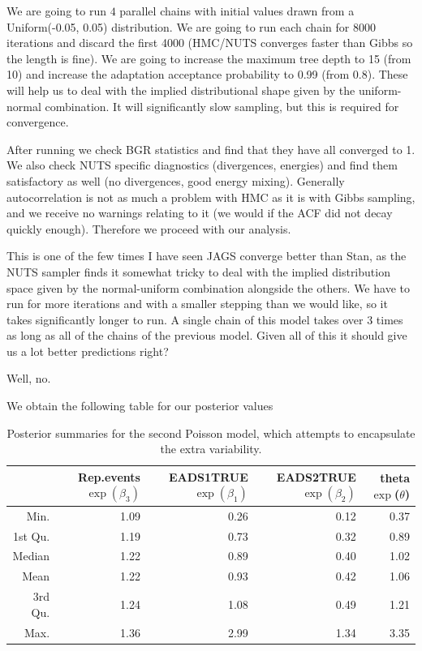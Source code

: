 \documentclass[10pt]{extarticle}
\begin{document}
We are going to run $4$ parallel chains with initial values drawn from a Uniform(-0.05, 0.05) distribution. We are going to run each chain for 8000 iterations and discard the first 4000 (HMC/NUTS converges faster than Gibbs so the length is fine). We are going to increase the maximum tree depth to 15 (from 10) and increase the adaptation acceptance probability to 0.99 (from 0.8). These will help us to deal with the implied distributional shape given by the uniform-normal combination. It will significantly slow sampling, but this is required for convergence.

After running we check BGR statistics and find that they have all converged to 1. We also check NUTS specific diagnostics (divergences, energies) and find them satisfactory as well (no divergences, good energy mixing). Generally autocorrelation is not as much a problem with HMC as it is with Gibbs sampling, and we receive no warnings relating to it (we would if the ACF did not decay quickly enough). Therefore we proceed with our analysis.

This is one of the few times I have seen JAGS converge better than Stan, as the NUTS sampler finds it somewhat tricky to deal with the implied distribution space given by the normal-uniform combination alongside the others. We have to run for more iterations and with a smaller stepping than we would like, so it takes significantly longer to run. A single chain of this model takes over 3 times as long as all of the chains of the previous model. Given all of this it should give us a lot better predictions right?

Well, no.

We obtain the following table for our posterior values

\begin{table}[ht]
	\centering
	\begin{tabular}{r|rrrr}
		\hline
		& Rep.events $\exp(\beta_3)$ & EADS1TRUE $\exp(\beta_1)$ & EADS2TRUE $\exp(\beta_2)$ & theta $\exp$($\theta$) \\ 
		\hline
		Min. & 1.09 & 0.26 & 0.12 & 0.37 \\ 
		1st Qu. & 1.19 & 0.73 & 0.32 & 0.89 \\ 
		Median & 1.22 & 0.89 & 0.40 & 1.02 \\ 
		Mean & 1.22 & 0.93 & 0.42 & 1.06 \\ 
		3rd Qu. & 1.24 & 1.08 & 0.49 & 1.21 \\ 
		Max. & 1.36 & 2.99 & 1.34 & 3.35 \\ 
		\hline
	\end{tabular}
\caption{Posterior summaries for the second Poisson model, which attempts to encapsulate the extra variability.}
\label{tab:postsum_poexv}
\end{table}
\end{document}
